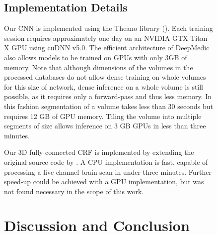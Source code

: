 \documentclass[preprint,authoryear,12pt]{elsarticle}
\begin{document}
\begin{figure}[h]
\subsection{Implementation Details}
 
Our CNN is implemented using the Theano library (\cite{Bastien-Theano-2012}). Each training session requires approximately one day on an NVIDIA GTX Titan X GPU using cuDNN v5.0. The efficient architecture of DeepMedic also allows models to be trained on GPUs with only 3GB of memory. Note that although dimensions of the volumes in the processed databases do not allow dense training on whole volumes for this size of network, dense inference on a whole volume is still possible, as it requires only a forward-pass and thus less memory. In this fashion segmentation of a volume takes less than 30 seconds but requires 12 GB of GPU memory. Tiling the volume into multiple segments of size  allows inference on 3 GB GPUs in less than three minutes.

Our 3D fully connected CRF is implemented by extending the original source code by \cite{Krahenbuhl2013}. A CPU implementation is fast, capable of processing a five-channel brain scan in under three minutes. Further speed-up could be achieved with a GPU implementation, but was not found necessary in the scope of this work.
 





\section{Discussion and Conclusion}
\label{sec:discussion}




\end{figure}
\end{document}
